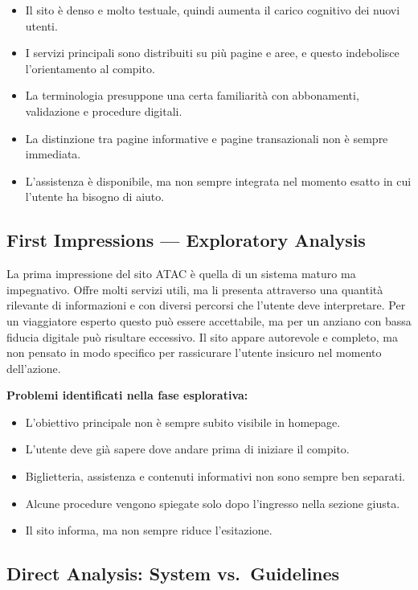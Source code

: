 ﻿\documentclass[11pt,a4paper]{article}
\begin{document}
\begin{itemize}
    \item Il sito è denso e molto testuale, quindi aumenta il carico cognitivo dei nuovi utenti.
    \item I servizi principali sono distribuiti su più pagine e aree, e questo indebolisce l’orientamento al compito.
    \item La terminologia presuppone una certa familiarità con abbonamenti, validazione e procedure digitali.
    \item La distinzione tra pagine informative e pagine transazionali non è sempre immediata.
    \item L’assistenza è disponibile, ma non sempre integrata nel momento esatto in cui l’utente ha bisogno di aiuto.
\end{itemize}

\subsection*{First Impressions --- Exploratory Analysis}

\noindent La prima impressione del sito ATAC è quella di un sistema maturo ma impegnativo. Offre molti servizi utili, ma li presenta attraverso una quantità rilevante di informazioni e con diversi percorsi che l’utente deve interpretare. Per un viaggiatore esperto questo può essere accettabile, ma per un anziano con bassa fiducia digitale può risultare eccessivo. Il sito appare autorevole e completo, ma non pensato in modo specifico per rassicurare l’utente insicuro nel momento dell’azione.

\noindent\textbf{Problemi identificati nella fase esplorativa:}

\begin{itemize}
    \item L’obiettivo principale non è sempre subito visibile in homepage.
    \item L’utente deve già sapere dove andare prima di iniziare il compito.
    \item Biglietteria, assistenza e contenuti informativi non sono sempre ben separati.
    \item Alcune procedure vengono spiegate solo dopo l’ingresso nella sezione giusta.
    \item Il sito informa, ma non sempre riduce l’esitazione.
\end{itemize}

\subsection*{Direct Analysis: System vs.\ Guidelines}
\end{document}

